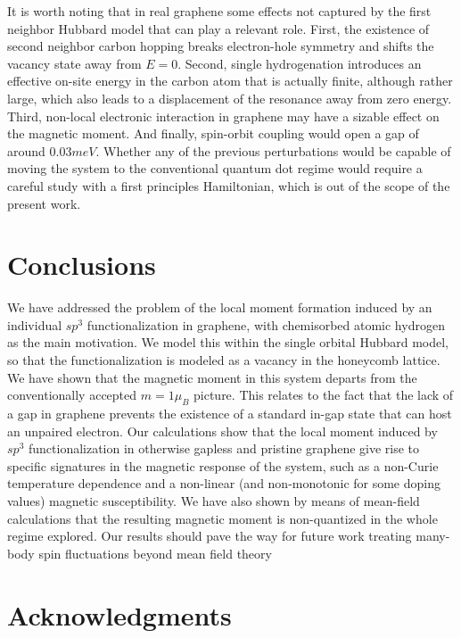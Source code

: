 \documentclass[aps,prb,twocolumn,superscriptaddress]{revtex4-1}
\begin{document}
It is worth noting that in real graphene some effects not captured by the first neighbor Hubbard model that can play a relevant role. First, the existence of second neighbor carbon hopping breaks electron-hole symmetry and shifts  the vacancy state away from $E=0$. Second, single hydrogenation introduces an effective on-site energy in the carbon atom that is actually finite, although rather large, which also leads to a displacement of the resonance away from zero energy.
Third, non-local electronic interaction in graphene may have a sizable effect on the magnetic moment.
And finally, spin-orbit coupling would open a gap of around $0.03meV$.
\cite{PhysRevB.80.235431, Gmitra2009}
Whether any of the previous perturbations would be capable of moving the system to the conventional quantum dot regime would require a careful study with a first principles Hamiltonian, which is out of the scope of the present work.

\section{Conclusions}
\label{sec:Concl}
We have addressed the problem of the local moment formation induced by an individual $sp^3$ functionalization in graphene, with chemisorbed atomic hydrogen as the  main motivation.  We model this within the single orbital Hubbard model, so that the functionalization is modeled as a vacancy in the  honeycomb lattice.  We have shown that the magnetic moment in this system  departs from  the conventionally accepted $m=1\mu_B$ picture. This relates to the fact that the lack of a gap in graphene prevents the existence of a standard in-gap state that can host an unpaired electron. Our calculations show that the local moment induced by $sp^3$ functionalization in otherwise gapless and pristine graphene
 give rise to specific signatures in the magnetic response of the system, such as a non-Curie temperature dependence and a non-linear (and non-monotonic for
some doping values) magnetic susceptibility.
We have also shown by means of mean-field calculations that the resulting magnetic moment is non-quantized in the whole regime explored. Our results should pave the way for future work treating many-body spin fluctuations beyond mean field theory\cite{haase2011magnetic,sofo2012magnetic,mitchell13}


\section{Acknowledgments}
\end{document}
